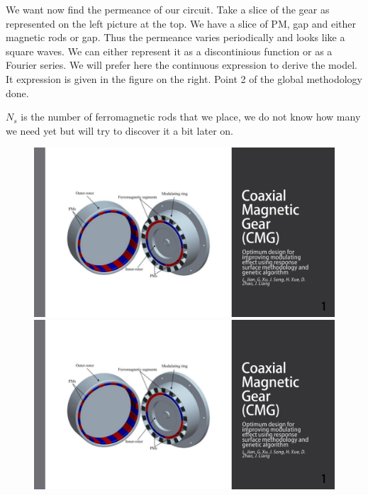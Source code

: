 We want now find the permeance of our circuit. Take a slice of the gear as represented on the left picture at the top. We have a slice of PM, gap and either magnetic rods or gap. Thus the permeance varies periodically and looks like a square waves. We can either represent it as a discontinious function or as a Fourier series. We will prefer here the continuous expression to derive the model. It expression is given in the figure on the right. Point 2 of the global methodology done.

$N_s$ is the number of ferromagnetic rods that we place, we do not know how many we need yet but will try to discover it a bit later on.
\begin{figure}[H]
    \begin{minipage}{.45\linewidth}
        \includegraphics[page={20},width=\textwidth]{LELEC2311.allow.pdf}
    \end{minipage}
    \hfill%
    \begin{minipage}[c]{.45\linewidth}
        \centering
        \includegraphics[page={21},width=\textwidth]{LELEC2311.allow.pdf}
    \end{minipage}
\end{figure}



